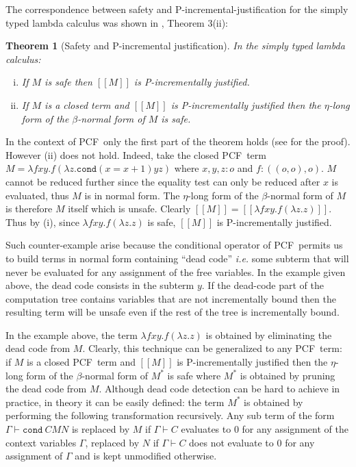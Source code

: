 \documentclass{article}
\newcommand{\sem}[1]{{[\![ #1 ]\!]}}
\newcommand\pcf{\textsf{PCF}}
\newcommand\pcfcond{\texttt{cond}}
\newtheorem{theorem}{Theorem}[section]
\theoremstyle{remark}
\theoremstyle{definition}
\begin{document}
The correspondence between safety and P-incremental-justification for the simply typed lambda calculus was shown
in \cite{blumong:safelambdacalculus}, Theorem 3(ii):

\begin{theorem}[Safety and P-incremental justification]
\label{thm:safeincrejust} In the simply typed lambda calculus:
\begin{enumerate}[(i)]
\item If $M$ is safe then $\sem{M}$ is P-incrementally justified.
\item If $M$ is a closed term and $\sem{M}$ is
  P-incrementally justified then the $\eta$-long form of the
  $\beta$-normal form of $M$ is safe.
\end{enumerate}
\end{theorem}
In the context of \pcf\, only the first part of the theorem holds (see \cite{blumtransfer} for the proof). However (ii) does not hold. Indeed, take the closed \pcf\ term $M = \lambda f x y. f (\lambda z. \pcfcond (x=x+1) y z )$ where $x,y,z:o$ and $f:((o,o),o)$. $M$ cannot be reduced further since the equality test can only be reduced after $x$ is evaluated, thus $M$ is in normal form. The $\eta$-long form of the $\beta$-normal form of $M$ is therefore $M$ itself which is unsafe.
Clearly $\sem{M} = \sem{\lambda f x y. f (\lambda z. z)}$. Thus by (i), since  $\lambda f x y. f (\lambda z. z)$ is safe, $\sem{M}$ is P-incrementally justified.

Such counter-example arise because the conditional operator
of \pcf\ permits us to build terms in normal form containing ``dead code'' {\it i.e.} some  subterm that will never be evaluated for any assignment of the free variables. In the example given above, the dead code consists in the subterm $y$. If the dead-code part of the computation tree contains variables that are not incrementally bound then the resulting term will be unsafe even if the rest of the tree is incrementally bound.

In the example above, the term $\lambda f x y. f (\lambda z. z)$ is obtained by eliminating the dead code from $M$. Clearly, this technique can be generalized to any \pcf\ term: if $M$ is a closed \pcf\ term and 
$\sem{M}$ is P-incrementally justified then 
 the $\eta$-long form of the $\beta$-normal form of $M^*$ is safe
where $M^*$ is obtained by pruning  the dead code from $M$. Although dead code detection can be hard to achieve in practice, in theory it can be easily defined: the term $M^*$ is obtained by performing the following transformation recursively. Any sub term of the form $\Gamma \vdash \pcfcond\ C M N$ is replaced by $M$ if $\Gamma \vdash C$ evaluates to $0$ for any assignment of the context variables $\Gamma$, replaced by $N$ if $\Gamma \vdash C$ does not evaluate to $0$ for any assignment of $\Gamma$ and is kept unmodified otherwise.
\end{document}
